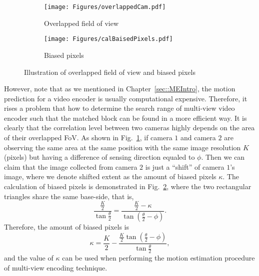 \begin{figure}
\begin{center}
\begin{subfigure}[b]{0.65\columnwidth}
\texttt{[image: Figures/overlappedCam.pdf]}
\caption{\label{fig::overlappedCam}Overlapped field of view}
\end{subfigure}
\begin{subfigure}[b]{0.5\columnwidth}
\texttt{[image: Figures/calBaisedPixels.pdf]}
\caption{\label{fig::calBaisedPixels}Biased pixels}
\end{subfigure}
\caption{\label{fig::overlappedAndBaised}Illustration of overlapped field of view and biased pixels}
\end{center}
\end{figure}
%
However, note that as we mentioned in Chapter~\ref{sec::MEIntro}, the motion prediction for a video encoder is usually computational expensive.
Therefore, it rises a problem that how to determine the search range of multi-view video encoder such that the matched block can be found in a more efficient way.
It is clearly that the correlation level between two cameras highly depends on the area of their overlapped FoV.
As shown in Fig.~\ref{fig::overlappedCam}, if camera $1$ and camera $2$ are observing the same area at the same position with the same image resolution $K$ (pixels) but having a difference of sensing direction equaled to $\phi$.
Then we can claim that the image collected from camera $2$ is just a ``shift'' of camera $1$'s image, where we denote shifted extent as the amount of biased pixels $\kappa$.
The calculation of biased pixels is demonstrated in Fig.~\ref{fig::calBaisedPixels}, where the two rectangular triangles share the same base-side, that is,
\begin{equation}
\frac{\frac{K}{2}}{\tan \frac{\theta}{2}} = \frac{\frac{K}{2}-\kappa}{\tan(\frac{\theta}{2}-\phi)}.
\label{eq::calBiasedPixels}
\end{equation}
Therefore, the amount of biased pixels is
\begin{equation}
\kappa = \frac{K}{2} - \frac{\frac{K}{2} \tan(\frac{\theta}{2}-\phi) }{\tan \frac{\theta}{2}},
\label{eq::biasedPixels}
\end{equation}
and the value of $\kappa$ can be used when performing the motion estimation procedure of multi-view encoding technique.
%